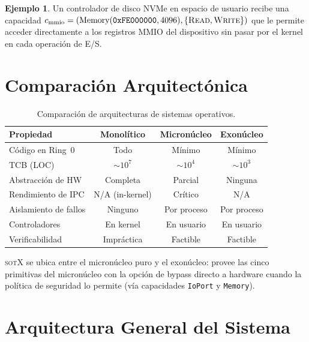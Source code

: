 \documentclass[11pt,twoside,openright]{book}
\theoremstyle{definition}
\newtheorem{example}{Ejemplo}[chapter]
\theoremstyle{plain}
\theoremstyle{remark}
\newcommand{\sotos}{\textsc{sotX}}
\begin{document}
\begin{example}
Un controlador de disco NVMe en espacio de usuario recibe una capacidad
$c_{\text{mmio}} = (\text{Memory}(\texttt{0xFE000000}, 4096), \{\textsc{Read}, \textsc{Write}\})$
que le permite acceder directamente a los registros MMIO del dispositivo sin pasar por
el kernel en cada operación de E/S.
\end{example}

\section{Comparación Arquitectónica}

\begin{table}[ht]
\centering
\caption{Comparación de arquitecturas de sistemas operativos.}
\label{tab:comparison}
\begin{tabular}{@{}lccc@{}}
\toprule
\textbf{Propiedad} & \textbf{Monolítico} & \textbf{Micronúcleo} & \textbf{Exonúcleo} \\
\midrule
Código en Ring~0        & Todo         & Mínimo        & Mínimo \\
TCB (LOC)               & $\sim 10^7$  & $\sim 10^4$   & $\sim 10^3$ \\
Abstracción de HW       & Completa     & Parcial       & Ninguna \\
Rendimiento de IPC      & N/A (in-kernel) & Crítico    & N/A \\
Aislamiento de fallos   & Ninguno      & Por proceso   & Por proceso \\
Controladores           & En kernel    & En usuario    & En usuario \\
Verificabilidad         & Impráctica   & Factible      & Factible \\
\bottomrule
\end{tabular}
\end{table}

\sotos{} se ubica entre el micronúcleo puro y el exonúcleo: provee las cinco primitivas
del micronúcleo con la opción de bypass directo a hardware cuando la política de seguridad
lo permite (vía capacidades \texttt{IoPort} y \texttt{Memory}).

\section{Arquitectura General del Sistema}
\end{document}
